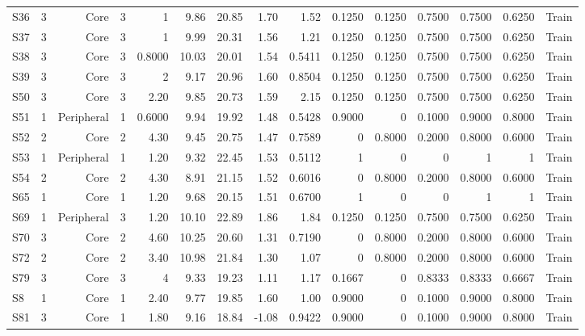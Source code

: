 {\begin{longtable}{lrrrrrrrrrrrrrr}
  S36 & 3 & Core & 3 & 1 & 9.86 & 20.85 & 1.70 & 1.52 & 0.1250 & 0.1250 & 0.7500 & 0.7500 & 0.6250 & Train \\
  S37 & 3 & Core & 3 & 1 & 9.99 & 20.31 & 1.56 & 1.21 & 0.1250 & 0.1250 & 0.7500 & 0.7500 & 0.6250 & Train \\
  S38 & 3 & Core & 3 & 0.8000 & 10.03 & 20.01 & 1.54 & 0.5411 & 0.1250 & 0.1250 & 0.7500 & 0.7500 & 0.6250 & Train \\
  S39 & 3 & Core & 3 & 2 & 9.17 & 20.96 & 1.60 & 0.8504 & 0.1250 & 0.1250 & 0.7500 & 0.7500 & 0.6250 & Train \\
  S50 & 3 & Core & 3 & 2.20 & 9.85 & 20.73 & 1.59 & 2.15 & 0.1250 & 0.1250 & 0.7500 & 0.7500 & 0.6250 & Train \\
  S51 & 1 & Peripheral & 1 & 0.6000 & 9.94 & 19.92 & 1.48 & 0.5428 & 0.9000 & 0 & 0.1000 & 0.9000 & 0.8000 & Train \\
  S52 & 2 & Core & 2 & 4.30 & 9.45 & 20.75 & 1.47 & 0.7589 & 0 & 0.8000 & 0.2000 & 0.8000 & 0.6000 & Train \\
  S53 & 1 & Peripheral & 1 & 1.20 & 9.32 & 22.45 & 1.53 & 0.5112 & 1 & 0 & 0 & 1 & 1 & Train \\
  S54 & 2 & Core & 2 & 4.30 & 8.91 & 21.15 & 1.52 & 0.6016 & 0 & 0.8000 & 0.2000 & 0.8000 & 0.6000 & Train \\
  S65 & 1 & Core & 1 & 1.20 & 9.68 & 20.15 & 1.51 & 0.6700 & 1 & 0 & 0 & 1 & 1 & Train \\
  S69 & 1 & Peripheral & 3 & 1.20 & 10.10 & 22.89 & 1.86 & 1.84 & 0.1250 & 0.1250 & 0.7500 & 0.7500 & 0.6250 & Train \\
  S70 & 3 & Core & 2 & 4.60 & 10.25 & 20.60 & 1.31 & 0.7190 & 0 & 0.8000 & 0.2000 & 0.8000 & 0.6000 & Train \\
  S72 & 2 & Core & 2 & 3.40 & 10.98 & 21.84 & 1.30 & 1.07 & 0 & 0.8000 & 0.2000 & 0.8000 & 0.6000 & Train \\
  S79 & 3 & Core & 3 & 4 & 9.33 & 19.23 & 1.11 & 1.17 & 0.1667 & 0 & 0.8333 & 0.8333 & 0.6667 & Train \\
  S8 & 1 & Core & 1 & 2.40 & 9.77 & 19.85 & 1.60 & 1.00 & 0.9000 & 0 & 0.1000 & 0.9000 & 0.8000 & Train \\
  S81 & 3 & Core & 1 & 1.80 & 9.16 & 18.84 & -1.08 & 0.9422 & 0.9000 & 0 & 0.1000 & 0.9000 & 0.8000 & Train \\
\end{longtable}
}
